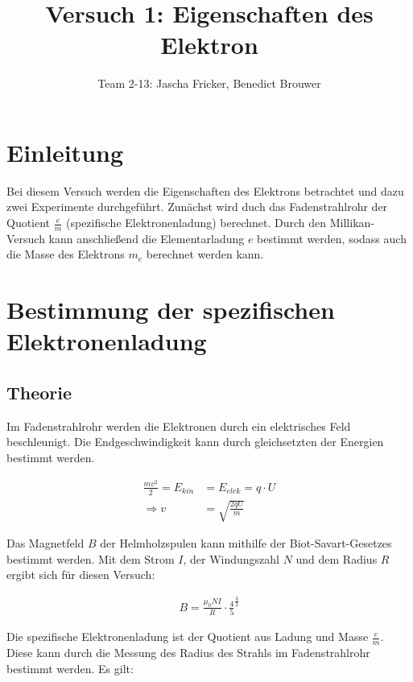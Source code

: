 \documentclass[11pt, a4paper]{article}
\title{Versuch 1: Eigenschaften des Elektron}
\author{Team 2-13: Jascha Fricker, Benedict Brouwer}
\begin{document}
    \maketitle


    \tableofcontents

    \newpage

    \section{Einleitung}

    Bei diesem Versuch werden die Eigenschaften des Elektrons betrachtet und dazu zwei Experimente durchgeführt. Zunächst wird duch das Fadenstrahlrohr
    der Quotient $\frac{e}{m}$ (spezifische Elektronenladung) berechnet. Durch den Millikan-Versuch kann anschließend die Elementarladung $e$ bestimmt
    werden, sodass auch die Masse des Elektrons $m_e$ berechnet werden kann.

    \section{Bestimmung der spezifischen Elektronenladung}

    \subsection{Theorie}

    Im Fadenstrahlrohr werden die Elektronen durch ein elektrisches Feld beschleunigt. Die Endgeschwindigkeit kann durch gleichsetzten der Energien bestimmt werden.

    \begin{align}
    \frac{mv^2}{2} = E_{kin} &= E_{elek} = q \cdot U \label{geschw}\\
    \Rightarrow v &= \sqrt{\frac{2qU}{m}}
    \end{align}
    
    Das Magnetfeld $B$ der Helmholzspulen kann mithilfe der Biot-Savart-Gesetzes bestimmt werden.
    Mit dem Strom $I$, der Windungszahl $N$ und dem Radius $R$ ergibt sich für diesen Versuch:

    \begin{align}
        B = \frac{\mu_0 N I}{R} \cdot \frac{4}{5}^{\frac{3}{2}} \label{B-Helm}
    \end{align}

    Die spezifische Elektronenladung ist der Quotient aus Ladung und Masse $\frac{e}{m}$.
    Diese kann durch die Messung des Radius des Strahls im Fadenstrahlrohr bestimmt werden. Es gilt:
\end{document}

